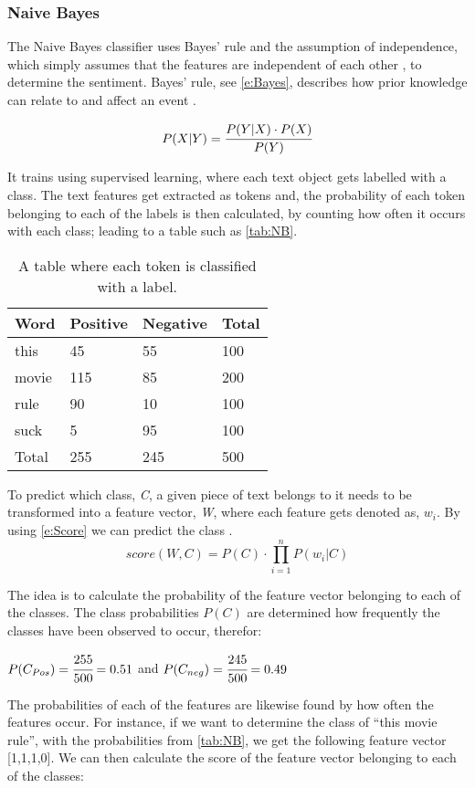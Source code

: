 \subsubsection{Naive Bayes} 
The Naive Bayes classifier uses Bayes' rule and the assumption of independence,
which simply assumes that the features are independent of each other
\citep[Proposition 6.5]{MIBook}, to determine the sentiment. Bayes' rule, see
\autoref{e:Bayes}, describes how prior knowledge can relate to and affect an
event \citep[P.229]{MIBook}. 

\begin{equation}\label{e:Bayes}
P(X|Y) = \cfrac{P(Y|X) \cdot P(X)}{P(Y)}
\end{equation}


It trains using supervised learning, where each text object gets labelled with a
class. The text features get extracted as tokens and, the probability of each
token belonging to each of the labels is then calculated, by counting how often
it occurs with each class; leading to a table such as \autoref{tab:NB}.

\begin{table}[H]
\centering
\begin{tabular}{|l|l|l|l|}
\hline
Word & Positive & Negative & Total 	\\ \hline
this & 45 & 55 & 100				\\ \hline
movie & 115 & 85 & 200				\\ \hline
rule & 90 & 10 & 100				\\ \hline
suck & 5 & 95 & 100					\\ \hline
Total & 255 & 245 & 500				\\ \hline
\end{tabular}
\caption{A table where each token is classified with a label.}
\label{tab:NB}
\end{table}

To predict which class, \textit{C}, a given piece of text belongs to it needs to
be transformed into a feature vector, \textit{W}, where each feature gets
denoted as, $w_{i}$. By using \autoref{e:Score} we can predict the class
\citep[Ch.2.1]{Bayes}.
\begin{equation}\label{e:Score} score(W,C) = P(C) \cdot
\displaystyle\prod_{i=1}^{n}P(w_{i}|C)
\end{equation}

The idea is to calculate the probability of the feature vector belonging to each
of the classes. The class probabilities $P(C)$ are determined how frequently the
classes have been observed to occur, therefor:
\begin{center}
$P(C_{Pos}) = \cfrac{255}{500} = 0.51 $ and $P(C_{neg}) = \cfrac{245}{500} =
0.49 $
\end{center}
The probabilities of each of the features are likewise found by how often the
features occur. For instance, if we want to determine the class of ``this
movie rule'', with the probabilities from \autoref{tab:NB}, we get the
following feature vector [1,1,1,0]. We can then calculate the score of
the feature vector belonging to each of the classes:


